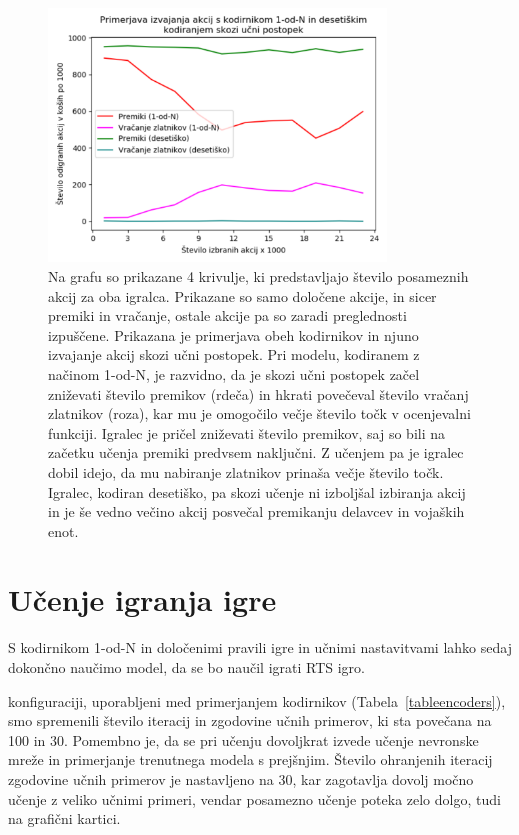 \documentclass[a4paper, 12pt]{book}
\begin{document}
{\begin{figure}[h!]
	\begin{center}
		\includegraphics[width=0.8\textwidth]{photos/onehot_numeric_primerjava_akcij.pdf}
	\end{center}
	\caption{Na grafu so prikazane 4 krivulje, ki predstavljajo število posameznih akcij za oba igralca. 
		Prikazane so samo določene akcije, in sicer premiki in vračanje, ostale akcije pa so zaradi preglednosti izpuščene.
		Prikazana je primerjava obeh kodirnikov in njuno izvajanje akcij skozi učni postopek.
		Pri modelu, kodiranem z načinom 1-od-N, je razvidno, da je skozi učni postopek začel zniževati število premikov (rdeča) in hkrati povečeval število vračanj zlatnikov (roza), kar mu je omogočilo večje število točk v ocenjevalni funkciji.
		Igralec je pričel zniževati število premikov, saj so bili na začetku učenja premiki predvsem naključni. Z učenjem pa je igralec dobil idejo, da mu nabiranje zlatnikov prinaša večje število točk.
		Igralec, kodiran desetiško, pa skozi učenje ni izboljšal izbiranja akcij in je še vedno večino akcij posvečal premikanju delavcev in vojaških enot. }
	\label{onehotPrimerjavaAkcij}
\end{figure}

\section{Učenje igranja igre}
S kodirnikom 1-od-N in določenimi pravili igre in učnimi nastavitvami lahko sedaj dokončno naučimo model, da se bo naučil igrati RTS igro.

konfiguraciji, uporabljeni med primerjanjem kodirnikov (Tabela~\ref{tableencoders}), smo spremenili število iteracij in zgodovine učnih primerov, ki sta povečana na 100 in 30.
Pomembno je, da se pri učenju dovoljkrat izvede učenje nevronske mreže in primerjanje trenutnega modela s prejšnjim.
Število ohranjenih iteracij zgodovine učnih primerov je nastavljeno na 30, kar zagotavlja dovolj močno učenje z veliko učnimi primeri, vendar posamezno učenje poteka zelo dolgo, tudi na grafični kartici.

}
\end{document}
